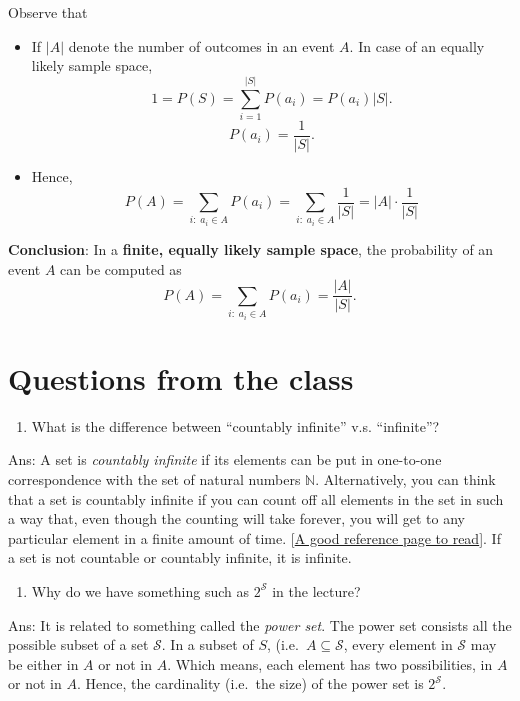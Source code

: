 \documentclass[
]{book}
\providecommand{\tightlist}{%
  \setlength{\itemsep}{0pt}\setlength{\parskip}{0pt}}
\theoremstyle{definition}
\theoremstyle{definition}
\theoremstyle{definition}
\theoremstyle{definition}
\theoremstyle{remark}
\begin{document}
Observe that

\begin{itemize}
\item
  If \(|A|\) denote the number of outcomes in an event \(A\). In case of an equally likely sample space,
  \[
  1=P(S)=\sum_{i=1}^{|S|}P(a_{i})= P(a_i)|S|.
  \]
  \[
  P(a_i)=\frac{1}{|S|}.
  \]
\item
  Hence,
  \[P(A) = \sum_{i:\;a_i \in A} P(a_i) = \sum_{i:\;a_i \in A} \frac{1}{|S|} =|A|\cdot  \frac{1}{|S|}\]
\end{itemize}

\textbf{Conclusion}: In a \textbf{finite, equally likely sample space}, the probability of an event \(A\) can be computed as
\[
P(A) = \sum_{i:\;a_i \in A} P(a_i) = \frac{|A|}{|S|}.
\]

\hypertarget{questions-from-the-class}{%
\section{Questions from the class}\label{questions-from-the-class}}

\begin{enumerate}
\def\labelenumi{\arabic{enumi}.}
\tightlist
\item
  What is the difference between ``countably infinite'' v.s. ``infinite''?
\end{enumerate}

Ans: A set is \emph{countably infinite} if its elements can be put in one-to-one correspondence with the set of natural numbers \(\mathbb{N}\). Alternatively, you can think that a set is countably infinite if you can count off all elements in the set in such a way that, even though the counting will take forever, you will get to any particular element in a finite amount of time. {[}\href{https://mathinsight.org/definition/countably_infinite}{A good reference page to read}{]}. If a set is not countable or countably infinite, it is infinite.

\begin{enumerate}
\def\labelenumi{\arabic{enumi}.}
\setcounter{enumi}{1}
\tightlist
\item
  Why do we have something such as \(2^\mathcal{S}\) in the lecture?
\end{enumerate}

Ans: It is related to something called the \emph{power set}. The power set consists all the possible subset of a set \(\mathcal{S}\). In a subset of \(S\), (i.e.~\(A \subseteq \mathcal{S}\), every element in \(\mathcal{S}\) may be either in \(A\) or not in \(A\). Which means, each element has two possibilities, in \(A\) or not in \(A\). Hence, the cardinality (i.e.~the size) of the power set is \(2^\mathcal{S}\).
\end{document}
